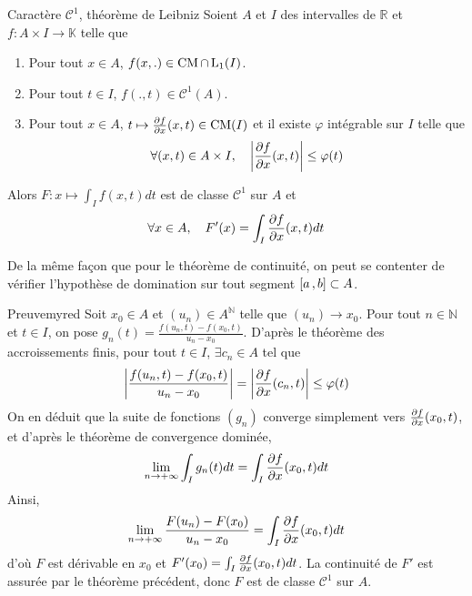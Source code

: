 
    \begin{theo}{Caractère $\mathcal{C}^1$, théorème de Leibniz}{}
        Soient $A$ et $I$ des intervalles de $\mathbb{R}$ et $f : A \times I \to \mathbb{K}$ telle que 
        \begin{enumerate}[label=$(h_{\alph*})$]
            \item Pour tout $x \in A$, $f(x,.) \in \operatorname{CM} \cap \operatorname{L}_1(I)$.
            \item Pour tout $t \in I$, $f(.,t) \in \mathcal{C}^1(A)$.
            \item Pour tout $x \in A$, $t \mapsto \frac{\partial f}{\partial x}(x,t) \in \operatorname{CM}(I)$ et il existe $\varphi$ intégrable sur $I$ telle que 
            \[ \forall (x,t) \in A \times I, \quad \left\lvert \frac{\partial f}{\partial x}(x,t)\right\rvert \leq \varphi(t) \]   
        \end{enumerate}
        Alors $F : x \mapsto \int_{I} f(x,t)dt$ est de classe $\mathcal{C}^1$ sur $A$ et 
        \[ \forall x \in A, \quad F'(x) = \int_{I} \frac{\partial f}{\partial x}(x,t)dt \]   
    \end{theo}

    De la même façon que pour le théorème de continuité, on peut se contenter de vérifier l’hypothèse de domination sur tout segment $\left[ a \, , b \right] \subset A$. 

    \begin{demo}{Preuve}{myred}
        Soit $x_0 \in A$ et $(u_n) \in A^{\mathbb{N}}$ telle que $(u_n) \to x_0$. Pour tout $n \in \mathbb{N}$ et $t \in I$, on pose $g_n(t) = \frac{f(u_n,t) - f(x_0,t)}{u_n - x_0}$. D’après le théorème des accroissements finis, pour tout $t \in I$, $\exists c_n \in A$ tel que 
        \[ \left\lvert \frac{f(u_n,t) - f(x_0,t)}{u_n - x_0}\right\rvert = \left\lvert \frac{\partial f}{\partial x}(c_n,t)\right\rvert \leq \varphi(t) \]   
        On en déduit que la suite de fonctions $(g_n)$ converge simplement vers $\frac{\partial f}{\partial x}(x_0,t)$, et d’après le théorème de convergence dominée, 
        \[ \lim_{n \to +\infty} \int_I g_n(t)dt = \int_I \frac{\partial f}{\partial x}(x_0,t)dt \] 
        Ainsi, 
        \[ \lim_{n \to +\infty} \frac{F(u_n) - F(x_0)}{u_n - x_0} = \int_I \frac{\partial f}{\partial x}(x_0,t)dt \] d’où $F$ est dérivable en $x_0$ et $F'(x_0) = \int_I \frac{\partial f}{\partial x}(x_0,t)dt$. La continuité de $F'$ est assurée par le théorème précédent, donc $F$ est de classe $\mathcal{C}^1$ sur $A$.  
    \end{demo}

